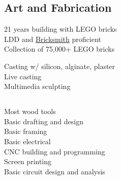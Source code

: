 \documentclass[a4paper]{deedy-resume} %
\begin{document}
    \begin{minipage}[t]{0.33\textwidth}
        \subsection{Art and Fabrication}
        
            \textbullet{} 21 years building with LEGO bricks\\
            \textbullet{} LDD and \href{http://bricksmith.sourceforge.net/}{Bricksmith} proficient\\
            \textbullet{} Collection of  75,000+ LEGO bricks

            \textbullet{} Casting w/ silicon, alginate, plaster\\
            \textbullet{} Live casting\\
            \textbullet{} Multimedia sculpting\\
        
    \end{minipage}
    \begin{minipage}[t]{0.29\textwidth}
    
        \subsection{}
        
            \textbullet{} Most wood tools \\
            \textbullet{} Basic drafting and design\\
            \textbullet{} Basic framing \\
            \textbullet{} Basic electrical \\

            \textbullet{} CNC building and programming \\
            \textbullet{} Screen printing\\
            \textbullet{} Basic circuit design and analysis\\
        
    \end{minipage}
\end{document}

